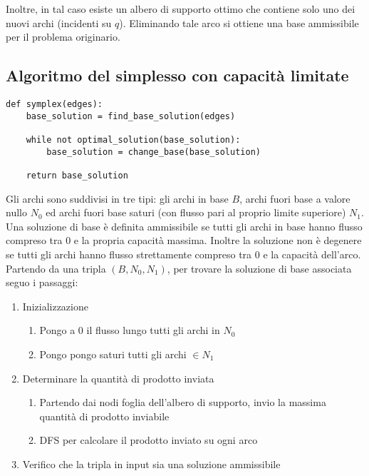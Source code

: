 \documentclass[../template]{subfiles}
\begin{document}
Inoltre, in tal caso esiste un albero di supporto ottimo che contiene solo uno dei nuovi archi (incidenti su $q$).
Eliminando tale arco si ottiene una base ammissibile per il problema originario.
% 

\subsection{Algoritmo del simplesso con capacità limitate}
\begin{lstlisting}
def symplex(edges):
    base_solution = find_base_solution(edges)

    while not optimal_solution(base_solution):
        base_solution = change_base(base_solution)

    return base_solution
\end{lstlisting}
Gli archi sono suddivisi in tre tipi: gli archi in base $B$, archi fuori base a valore nullo $N_0$ ed archi fuori base saturi
(con flusso pari al proprio limite superiore) $N_1$.
\\
Una soluzione di base è definita ammissibile se tutti gli archi in base hanno flusso compreso tra 0 e la propria capacità massima.
Inoltre la soluzione non è degenere se tutti gli archi hanno flusso strettamente compreso tra 0 e la capacità dell'arco.
\\
Partendo da una tripla $(B, N_0, N_1)$, per trovare la soluzione di base associata seguo i passaggi:
\begin{enumerate}
    \item Inizializzazione
        \begin{enumerate}
            \item Pongo a 0 il flusso lungo tutti gli archi in $N_0$
            \item Pongo pongo saturi tutti gli archi $\in N_1$
        \end{enumerate}
    \item Determinare la quantità di prodotto inviata
        \begin{enumerate}
            \item Partendo dai nodi foglia dell'albero di supporto, invio la massima quantità di prodotto inviabile
            \item DFS per calcolare il prodotto inviato su ogni arco
        \end{enumerate}
    \item Verifico che la tripla in input sia una soluzione ammissibile
\end{enumerate}
\end{document}
